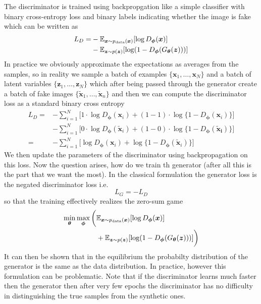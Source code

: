 \documentclass{myclass}
\begin{document}
The discriminator is trained using backpropgation like a simple classifier with binary
cross-entropy loss and binary labels indicating whether the image is fake which can be written as
\[
\begin{split}
   L_D = &-\mathbb{E}_{\bm{x} \sim p_\text{data}(\bm{x})} [\log D_{\bm{\phi}}(\bm{x})] \\
         &-\mathbb{E}_{\bm{z} \sim p(\bm{z})}[\log(1 - D_{\bm{\phi}}(G_{\bm{\theta}}(\bm{z})))]
\end{split}
\]
In practice we obviously approximate the expectations as averages from the samples, so in reality we
sample a batch of examples $\{\bm{x}_1, \ldots, \bm{x}_N\}$ and a batch of latent variables
$\{\bm{z}_1, \ldots, \bm{z}_N\}$ which after being passed through the generator create a batch of
fake images $\{\bm{\tilde{x}}_1, \ldots, \bm{\tilde{x}}_n\}$ and then we can compute the
discriminator loss as a standard binary cross entropy
\[
\begin{split}
   L_D = &- \sum_{i=1}^N \bigg[ 1 \cdot \log D_{\bm{\phi}}(\bm{x}_i) + (1 - 1) \cdot \log \{1 - D_{\bm{\phi}}(\bm{x}_i)\} \bigg]\\
         &- \sum_{i=1}^N \bigg[ 0 \cdot \log D_{\bm{\phi}}(\bm{\tilde{x}}_i) + (1 - 0) \cdot \log \{1 - D_{\bm{\phi}}(\bm{\tilde{x}_i})\} \bigg]\\
       = &- \sum_{i=1}^N \bigg[ \log D_{\bm{\phi}}(\bm{x}_i) + \log \{1 - D_{\bm{\phi}}(\bm{\tilde{x}}_i)\} \bigg]
\end{split}
\]
We then update the parameters of the discriminator using backpropagation on this loss. Now the
question arises, how do we train th generator (after all this is the part that we want the most). In
the classical formulation the generator loss is the negated discriminator loss i.e.
\[
   L_G = -L_D
\]
so that the training effectively realizes the zero-sum game
\[
\begin{split}
   \min_{\bm{\theta}} \max_{\bm{\phi}} \bigg( &\mathbb{E}_{\bm{x} \sim p_\text{data}(\bm{x})} [\log D_{\bm{\phi}}(\bm{x})] \\
                                       &+ \mathbb{E}_{\bm{z} \sim p(\bm{z})}[\log(1 - D_{\bm{\phi}}(G_{\bm{\theta}}(\bm{z})))] \bigg)
\end{split}
\]
It can then be shown that in the equilibrium the probabilty distribution of the generator is the
same as the data distribution. In practice, however this formulation can be problematic. Note that
if the discriminator learns much faster then the generator then after very few epochs the
discriminator has no difficulty in distinguishing the true samples from the synthetic ones.
\end{document}
